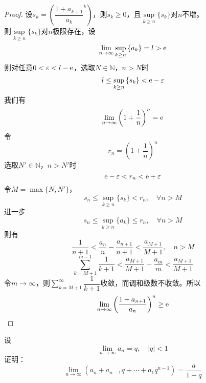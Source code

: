 \begin{proof}

    设$s_k = \left( \dfrac{1+a_{k+1}}{a_k}^k \right)$，则$s_k \geq 0$，且$\sup\limits_{k\geq n}\{s_k\}$对$n$不增。\\
    则$\sup\limits_{k\geq n}\{s_k\}$对$n$极限存在，设
    $$\lim_{n\to\infty}{\sup_{k\geq n}{\{a_k\}}} = l >\mathrm{e}$$
    则对任意$0 < \varepsilon < l - \mathrm{e}$，选取$N \in \mathbb{N}$，$n > N$时
    $$l \leq \sup_{k\geq n }{\{s_k\}} < \mathrm{e} - \varepsilon$$
    我们有
    $$\lim_{n\to\infty}{\left( 1 + \dfrac{1}{n}\right)^n} = \mathrm{e}$$
    令
    $$r_n = \left(1 + \dfrac{1}{n}\right)^n$$
    选取$N' \in \mathbb{N}$，$n > N'$时
    $$\mathrm{e} - \varepsilon < r_n < \mathrm{e} + \varepsilon$$
    令$M = \max\{N,N'\}$，
    $$s_n \leq \sup_{k\geq n}\{s_k\} < r_n, \quad \forall n > M$$
    进一步
    $$s_n \leq \sup_{k\geq n}\{a_k\} \leq r_n,\quad \forall n > M$$
    则有
    $$\dfrac{1}{n+1} < \dfrac{a_n}{n} - \dfrac{a_{n+1}}{n+1} < \dfrac{a_{M+1}}{M+1}, \quad n > M$$
    $$\sum_{k=M+1}^{m-1}{\dfrac{1}{k+1}} < \dfrac{a_{M+1}}{M+1} - \dfrac{a_m}{m} < \dfrac{a_{M+1}}{M+1}$$
    令$m \to \infty$，则$\sum\limits_{k=M+1}^{\infty}{\dfrac{1}{k+1}}$收敛，而调和级数不收敛。所以
    $$\lim_{n\to\infty}{\left( \dfrac{1+a_{n+1}}{a_n} \right)^n} \geq \mathrm{e}$$

\end{proof}

\begin{proposition}
    
    设
    $$\lim_{n\to\infty}{a_n} = q, \quad |q| < 1$$
    证明：
    $$\lim_{n\to\infty}{(a_n + a_{n-1}q + \cdots + a_1q^{n-1})} = \dfrac{a}{1 - q}$$

\end{proposition}

